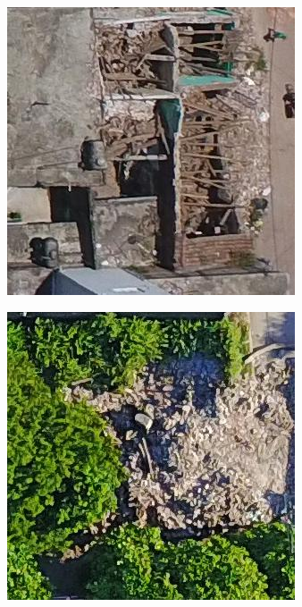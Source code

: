 \begin{figure}[!ht]
\begin{subfigure}{.24\textwidth}
    \end{subfigure}
    \begin{subfigure}{.24\textwidth}
        \includegraphics[width=\textwidth]{images/damaged3.jpg}
    \end{subfigure}
    \begin{subfigure}{.24\textwidth}
        \includegraphics[width=\textwidth]{images/damaged4.jpg}

\end{subfigure}
\end{figure}
